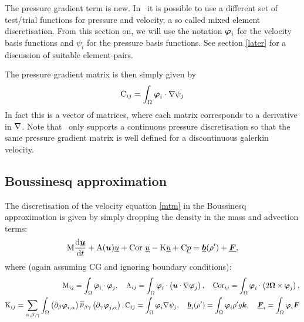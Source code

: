 The pressure gradient term is new. In \fluidity\ it is possible 
to use a different set of test/trial functions for pressure 
and velocity, a so called mixed element discretisation. From this section 
on, we will use the notation ${\mbox{\boldmath$\varphi$}}_i$ for the velocity 
basis functions and $\psi_i$ for the pressure basis functions.
See section \ref{later} for a discussion of suitable element-pairs.

The pressure gradient matrix is then simply given by
\begin{equation}
  \mathrm{C}_{ij}=\int_\Omega {\mbox{\boldmath$\varphi$}}_i\cdot\nabla\psi_j \label{pgmatrix}
\end{equation}
In fact this is a vector of matrices, where each matrix corresponds
to a derivative in $\nabla$. Note that \fluidity\ only supports
a continuous pressure discretisation so that the same 
pressure gradient matrix is well defined for a discontinuous galerkin 
velocity.

\subsection{Boussinesq approximation}
The discretisation of the velocity equation \eqref{mtm} 
in the Boussinesq approximation is given by simply 
dropping the density in the mass and advection terms:
\begin{equation*}
  \mathrm{M} \frac{\mathrm{d}\underline{{\mbox{\boldmath$u$}}}}{\mathrm{d} t}
    +\mathrm{A}({\mbox{\boldmath$u$}})\underline{u}
    +\mathrm{Cor}~\underline{u}
    -\mathrm{K}\underline{u}    
    +\mathrm{C} \underline{p}
    =\underline{{\mbox{\boldmath$b$}}}(\rho')+\underline{{\mbox{\boldmath$F$}}},
\end{equation*}
where (again assuming CG and ignoring boundary conditions):
\begin{equation*}
\begin{split}
  \mathrm{M}_{ij}=\int_\Omega {\mbox{\boldmath$\varphi$}}_i\cdot{\mbox{\boldmath$\varphi$}}_j, \quad
  \mathrm{A}_{ij}=\int_\Omega {\mbox{\boldmath$\varphi$}}_i\cdot\left({\mbox{\boldmath$u$}}\cdot\nabla {\mbox{\boldmath$\varphi$}}_j\right), \quad
  \mathrm{Cor}_{ij}=
    \int_\Omega {\mbox{\boldmath$\varphi$}}_i\cdot\left(2{\mbox{\boldmath$\Omega$}}\times{\mbox{\boldmath$\varphi$}}_j\right), \\
  \mathrm{K}_{ij}=\sum_{\alpha,\beta,\gamma} \int_\Omega 
    \left(\partial_\beta{\mbox{\boldmath$\varphi$}}_{i,\alpha}\right) \overline{\overline{\nu}}_{\beta\gamma}
      \left(\partial_\gamma {\mbox{\boldmath$\varphi$}}_{j,\alpha}\right),
  \mathrm{C}_{ij}=\int_\Omega {\mbox{\boldmath$\varphi$}}_i\nabla\psi_j, \quad
    \underline{{\mbox{\boldmath$b$}}}_i(\rho')=\int_\Omega {\mbox{\boldmath$\varphi$}}_i\rho'g{\mbox{\boldmath$k$}},\quad
    \underline{{\mbox{\boldmath$F$}}}_i=\int_\Omega {\mbox{\boldmath$\varphi$}}_i{\mbox{\boldmath$F$}}
\end{split}
\end{equation*}

